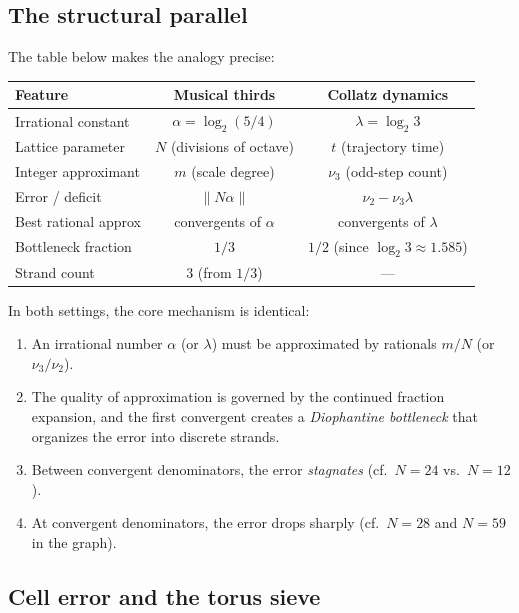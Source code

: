 \documentclass[12pt]{article}
\theoremstyle{plain}
\theoremstyle{definition}
\theoremstyle{remark}
\numberwithin{equation}{section}
\begin{document}
\subsection{The structural parallel}

The table below makes the analogy precise:

\begin{center}
\renewcommand{\arraystretch}{1.3}
\begin{tabular}{lcc}
\toprule
\textbf{Feature} & \textbf{Musical thirds} & \textbf{Collatz dynamics} \\
\midrule
Irrational constant & $\alpha = \log_2(5/4)$ & $\lambda = \log_2 3$ \\
Lattice parameter & $N$ (divisions of octave) & $t$ (trajectory time) \\
Integer approximant & $m$ (scale degree) & $\nu_3$ (odd-step count) \\
Error / deficit & $\|N\alpha\|$ & $\nu_2 - \nu_3 \lambda$ \\
Best rational approx & convergents of $\alpha$ & convergents of $\lambda$ \\
Bottleneck fraction & $1/3$ & $1/2$ (since $\log_2 3 \approx 1.585$) \\
Strand count & $3$ (from $1/3$) & --- \\
\bottomrule
\end{tabular}
\end{center}

In both settings, the core mechanism is identical:
\begin{enumerate}
\item An irrational number $\alpha$ (or $\lambda$) must be approximated
  by rationals $m/N$ (or $\nu_3/\nu_2$).
\item The quality of approximation is governed by the continued fraction
  expansion, and the first convergent creates a \emph{Diophantine bottleneck}
  that organizes the error into discrete strands.
\item Between convergent denominators, the error \emph{stagnates}
  (cf.\ $N=24$ vs.\ $N=12$).
\item At convergent denominators, the error drops sharply (cf.\ $N=28$
  and $N=59$ in the graph).
\end{enumerate}

\subsection{Cell error and the torus sieve}
\end{document}
